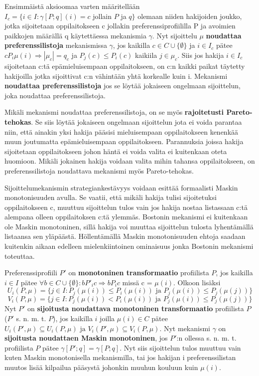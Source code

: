 \documentclass{tktltiki}
\begin{document}
Ensimmäistä aksioomaa varten määritellään \\ \(I_c = \{i \in I : \gamma
[P;q](i) = c\) jollain \(P\) ja \(q\}\) olemaan niiden hakijoiden joukko,
jotka sijoitetaan oppilaitokseen c jollakin preferenssiprofiililla P
ja avoimien paikkojen määrällä q käytettäessa mekanismia \(\gamma\).
Nyt sijoittelu \(\mu\) \textbf{noudattaa preferenssilistoja}
mekanismissa \(\gamma\), jos kaikilla \(c \in C \cup \{\emptyset\}\)
ja \(i \in I_c\) pätee \(cP_{i}\mu(i) \Rightarrow |\mu_c| = q_c\) ja
\(P_j(c) \leq P_i(c)\) kaikiila \(j \in \mu_c\). Siis jos hakija \(i \in
I_c\) sijoitetaan c:tä epämieluisempaan oppilaitokseen, on c:n kaikki
paikat täytetty hakijoilla jotka sijoittivat c:n vähintään yhtä
korkealle kuin i. Mekanismi \textbf{noudattaa preferenssilistoja} jos se
löytää jokaiseen ongelmaan sijoittelun, joka noudattaa
preferenssilistoja.

Mikäli mekanismi noudattaa preferenssilistoja, on se myös
\textbf{rajoitetusti Pareto-tehokas}. Se siis löytää jokaiseen ongelmaan
sijoittelun jota ei voida parantaa niin, että ainakin yksi hakija
pääsisi mieluisempaan oppilaitokseen kenenkää muun joutumatta
epämieluisempaan oppilaitokseen. Parannuksia joissa hakija sijoitetaan
oppilaitokseen johon häntä ei voida valita ei kuitenkaan oteta
huomioon. Mikäli jokainen hakija voidaan valita mihin tahansa
oppilaitokseen, on preferenssilistoja noudattava mekanismi myös
Pareto-tehokas.

Sijoittelumekanismin strategiankestävyys voidaan esittää formaalisti
Maskin monotonisuuden avulla. Se vaatii, että mikäli hakija tulisi
sijoitetuksi oppilaitokseen c, muuttuu sijoittelun tulos vain jos
hakija nostaa listassaan c:tä alempana olleen oppilaitoksen c:tä
ylemmäs. Bostonin mekanismi ei kuitenkaan ole Maskin monotoninen,
sillä hakija voi muuttaa sijoittelun tulosta lyhentämällä listaansa
sen yläpäästä. Höllentämällä Maskin monotonisuuden ehtoja saadaan
kuitenkin aikaan edelleen mielenkiintoinen ominaisuus jonka Bostonin
mekanismi toteuttaa.

Preferenssiprofiili \(P'\) on \textbf{monotoninen transformaatio}
profiilista \(P\), jos kaikilla \(i \in I\) pätee \(\forall b \in C
\cup \{\emptyset\}:bP'_{i}c \Rightarrow bP_{i}c\) missä c =
\(\mu(i)\). Olkoon lisäksi \[U_i(P,\mu) = \{j \in I : P_j(\mu (i)) \leq
P_i(\mu (i)) \text{ ja } P_j(\mu (i)) \leq P_j(\mu (j))\}\]
\[V_i(P,\mu) = \{j \in I : P_j(\mu (i)) < P_i(\mu (i)) \text{ ja } P_j(\mu
(i)) \leq P_j(\mu (j))\}\] Nyt \(P'\) on \textbf{sijoitusta noudattava
  monotoninen transformaatio} profiilista \(P\) (\(P'\) s. n. m. t.
\(P\)), jos kaikilla \(i\) joilla \(\mu (i) \in C\) pätee
\(U_i(P',\mu) \subseteq U_i(P,\mu) \text{ ja } V_i(P',\mu) \subseteq
V_i(P,\mu)\). Nyt mekanismi \(\gamma\) on \textbf{sijoitusta
  noudattaen Maskin monotoninen}, jos \(P'\):n ollessa s. n. m. t.
profiilista \(P\) pätee \(\gamma [P';q] = \gamma [P;q]\). Nyt siis
sijoittelun tulos muuttuu vain kuten Maskin monotonisella
mekanismilla, tai jos hakijan i preferenssilistan muutos lisää kilpailua
pääsystä johonkin muuhun kouluun kuin \(\mu (i)\).
\end{document}

